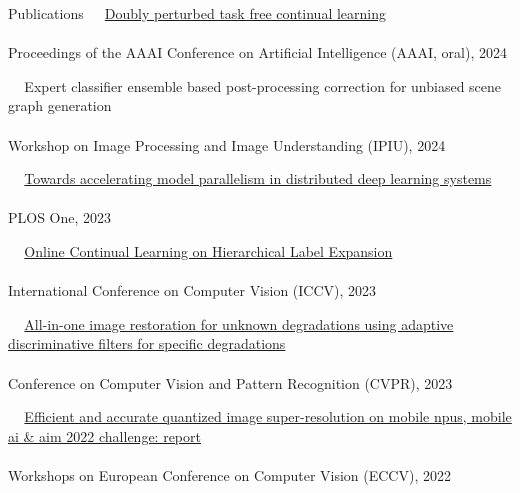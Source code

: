\documentclass{resume} %
\newcommand{\mycolor}[1]{\textcolor{myurlcolor}{#1}}
\begin{document}
\begin{rSection}{Publications}
\textbullet~\,\, \href{https://arxiv.org/abs/2312.13027}{Doubly perturbed task free continual learning}
\\ 
\\ \hspace*{1.5em}Proceedings of the AAAI Conference on Artificial Intelligence (AAAI, oral), 2024


\textbullet~\,\, {\mycolor{Expert classifier ensemble based post-processing correction for unbiased scene graph generation}}
\\ 
\\ \hspace*{1.5em}Workshop on Image Processing and Image Understanding (IPIU), 2024



\textbullet~\,\, \href{https://journals.plos.org/plosone/article?id=10.1371/journal.pone.0293338}{Towards accelerating model parallelism in distributed deep learning systems}
\\ 
\\ \hspace*{1.5em}PLOS One, 2023


\textbullet~\,\, \href{https://ieeexplore.ieee.org/document/10377260}{Online Continual Learning on Hierarchical Label Expansion
}
\\ 
\\ \hspace*{1.5em}International Conference on Computer Vision (ICCV), 2023


\textbullet~\,\, \href{https://ieeexplore.ieee.org/document/10204770}{All-in-one image restoration for unknown degradations using adaptive discriminative filters for specific degradations}
\\ 
\\ \hspace*{1.5em}Conference on Computer Vision and Pattern Recognition (CVPR), 2023


\textbullet~\,\, \href{https://link.springer.com/chapter/10.1007/978-3-031-25066-8_4}{Efficient and accurate quantized image super-resolution on mobile npus, mobile ai \& aim 2022 challenge: report
}
\\ 
\\ \hspace*{1.5em}Workshops on European Conference on Computer Vision (ECCV), 2022



\end{rSection}
\end{document}
